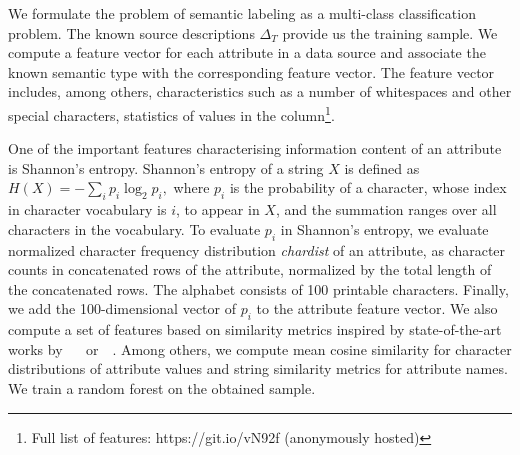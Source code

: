 \documentclass[letterpaper]{article} %
\newcommand{\authornote}[3]{
  {\fbox{\sc 
  #1}:$\blacktriangleright$\textcolor{#2}{\small{#3}}$\blacktriangleleft$}%
}
\newcommand{\npr}[1]{\authornote{NPR}{orange}{#1}}
\newcommand{\ignore}[1]{}
\newcommand{\forijcai}[1]{}
\newcommand{\citeasnoun}[1]{\citeauthor{#1}~\shortcite{#1}}
\begin{document}
We formulate the problem of semantic labeling as a multi-class classification
problem.
The known source descriptions $\Delta_T$ provide us the training sample.
We compute a feature vector for each attribute in a data source and associate 
the known semantic type with the corresponding feature vector.
The feature vector includes, among others, characteristics
such as a number 
of whitespaces and other special characters, statistics of 
values in the column\footnote{Full list of features: https://git.io/vN92f (anonymously hosted)}. 
\forijcai{A full list can be found in Appendix \ref{Ann:SemLab}.}
One of the important features characterising information content of an attribute is Shannon's entropy.
Shannon's entropy 
 of a string $X$ is defined as
$H(X) = -\sum_{i}{p_i \log_{2}p_i},$ where $p_i$ is the probability of a character, whose index in character vocabulary is $i$, to appear in $X$, and the summation ranges over all
characters in the vocabulary.
To evaluate $p_i$ in Shannon's entropy, we evaluate normalized character frequency distribution \emph{chardist} of an attribute, as character counts in concatenated rows of the attribute, normalized by the total length of the concatenated rows.
The alphabet\forijcai{vocabulary of all characters} consists of 100 printable characters\forijcai{ (including $\backslash$n)}.
Finally, we add the 100-dimensional vector of $p_i$ to the attribute feature vector.
We also compute a set of features based on similarity metrics inspired by state-of-the-art works by ~\citeasnoun{Pham:semantic} or~\citeasnoun{Ritze:matching}.
Among others, we compute mean cosine similarity for character distributions of attribute values and string similarity metrics for attribute names.
We train a random forest on the obtained sample. 
\end{document}
